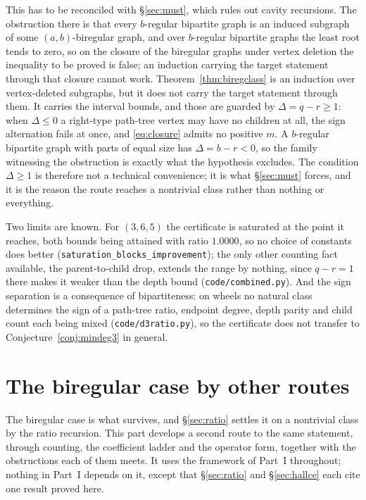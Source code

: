 \documentclass[11pt]{article}
\theoremstyle{remark}
\begin{document}
This has to be reconciled with \S\ref{sec:must}, which rules out cavity recursions. The
obstruction there is that every $b$-regular bipartite graph is an induced subgraph of some
$(a,b)$-biregular graph, and over $b$-regular bipartite graphs the least root tends to zero, so
on the closure of the biregular graphs under vertex deletion the inequality to be proved is
false; an induction carrying the target statement through that closure cannot work.
Theorem~\ref{thm:biregclass} is an induction over vertex-deleted subgraphs, but it does not carry
the target statement through them. It carries the interval bounds, and those are guarded by
$\Delta=q-r\ge1$: when $\Delta\le0$ a right-type path-tree vertex may have no children at all,
the sign alternation fails at once, and \eqref{eq:closure} admits no positive $m$. A $b$-regular
bipartite graph with parts of equal size has $\Delta=b-r<0$, so the family witnessing the
obstruction is exactly what the hypothesis excludes. The condition $\Delta\ge1$ is therefore not
a technical convenience; it is what \S\ref{sec:must} forces, and it is the reason the route
reaches a nontrivial class rather than nothing or everything.

Two limits are known. For $(3,6,5)$ the certificate is saturated at the point it reaches, both
bounds being attained with ratio $1.0000$, so no choice of constants does better
(\texttt{saturation\_blocks\_improvement}); the only other counting fact available, the
parent-to-child drop, extends the range by nothing, since $q-r=1$ there makes it weaker than the
depth bound (\texttt{code/combined.py}). And the sign separation is a consequence of
bipartiteness: on wheels no natural class determines the sign of a path-tree ratio, endpoint
degree, depth parity and child count each being mixed (\texttt{code/d3ratio.py}), so the
certificate does not transfer to Conjecture~\ref{conj:mindeg3} in general.

\part{The biregular case by other routes}

The biregular case is what survives, and \S\ref{sec:ratio} settles it on a nontrivial class by
the ratio recursion. This part develops a second route to the same statement, through counting,
the coefficient ladder and the operator form, together with the obstructions each of them meets.
It uses the framework of Part~I throughout; nothing in Part~I depends on it, except that
\S\ref{sec:ratio} and \S\ref{sec:hallce} each cite one result proved here.
\end{document}
